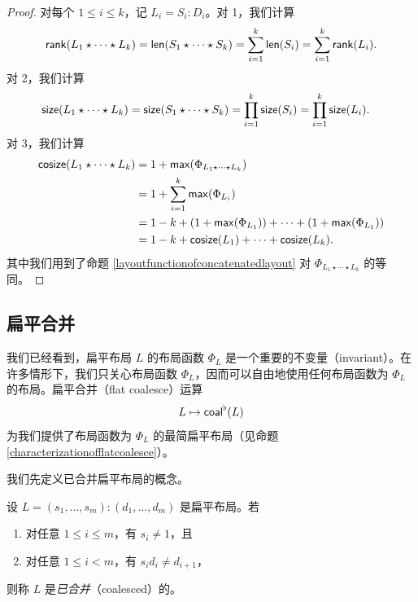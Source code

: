 \begin{proof}
    对每个 $1 \leq i \leq k$，记 $L_i = S_i:D_i$。对 1，我们计算
    \begin{align*}
        \mathsf{rank}(L_1 \star \cdots \star L_k) & = \mathsf{len}(S_1 \star \cdots \star S_k) = \sum_{i=1}^k \mathsf{len}(S_i) = \sum_{i=1}^k \mathsf{rank}(L_i).\\
    \end{align*}
    对 2，我们计算
    \begin{align*}
        \mathsf{size}(L_1 \star \cdots \star L_k) & = \mathsf{size}(S_1 \star \cdots \star S_k) = \prod_{i=1}^k \mathsf{size}(S_i) = \prod_{i=1}^k \mathsf{size}(L_i).
    \end{align*}
    对 3，我们计算
    \begin{align*}
    \mathsf{cosize}(L_1 \star \cdots \star L_k)  & = 1 + \mathsf{max}(\Phi_{L_1 \star \cdots \star L_k})\\
    & = 1 + \sum_{i=1}^k\mathsf{max}(\Phi_{L_i})\\
    & = 1 - k + \left( 1 + \mathsf{max}(\Phi_{L_1}) \right) + \cdots + \left( 1 + \mathsf{max}(\Phi_{L_1}) \right)\\
    & = 1 - k + \mathsf{cosize}(L_1) + \cdots + \mathsf{cosize}(L_k).
    \end{align*}
    其中我们用到了命题 \ref{layoutfunctionofconcatenatedlayout} 对 $\Phi_{L_1 \star \cdots \star L_k}$ 的等同。
\end{proof}



\subsection{扁平合并}
我们已经看到，扁平布局 $L$ 的布局函数 $\Phi_L$ 是一个重要的不变量（invariant）。在许多情形下，我们只关心布局函数 $\Phi_L$，因而可以自由地使用任何布局函数为 $\Phi_L$ 的布局。扁平合并（flat coalesce）运算
\[L \mapsto \mathsf{coal}^\flat(L)\]
为我们提供了布局函数为 $\Phi_L$ 的最简扁平布局（见命题 \ref{characterizationofflatcoalesce}）。

我们先定义已合并扁平布局的概念。
\begin{definition} \label{definitionofflatlayoutcoalesce}
设 $L = (s_1,\dots,s_m):(d_1,\dots,d_m)$ 是扁平布局。若
\begin{enumerate}
    \item 对任意 $1 \leq i \leq m$，有 $s_i \neq 1$，且
    \item 对任意 $1 \leq i <m$，有 $s_id_i \neq d_{i+1}$，
\end{enumerate}
则称 $L$ 是{\it 已合并}（coalesced）的。
\end{definition}

